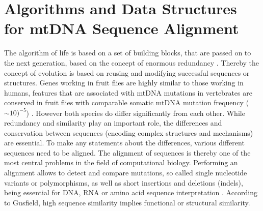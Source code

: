 \chapter{Algorithms and Data Structures for mtDNA Sequence Alignment}
\label{chapterAlignment}
\label{chap:alignment}
The algorithm of life is based on a set of building blocks, that are passed on to the next generation, based on the concept of enormous redundancy \cite{DO90}. Thereby the concept of evolution is based on reusing and modifying successful sequences or structures. Genes working in fruit flies are highly similar to those working in humans, features that are associated with mtDNA mutations in vertebrates are conserved in fruit flies with comparable somatic mtDNA mutation frequency (${\sim 10})^{-5}$) \cite{Itsara2014}. However both species do differ significantly from each other. While redundancy and similarity play an important role, the differences and conservation between sequences (encoding complex structures and mechanisms) are essential. To make any statements about the differences, various different sequences need to be aligned. The alignment of sequences is thereby one of the most central problems in the field of computational biology. Performing an alignment allows to detect and compare mutations, so called single nucleotide variants or polymorphisms, as well as short insertions and deletions (indels), being essential for DNA, RNA or amino acid sequence interpretation \cite{Gusfield1997}. According to Gusfield, high sequence similarity implies functional or structural similarity.  

